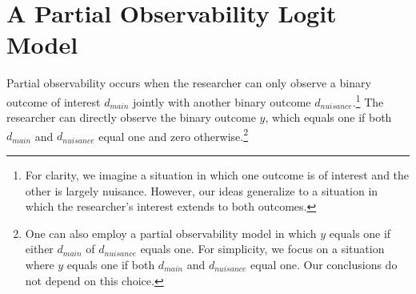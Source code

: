 \documentclass[10pt]{article}
\begin{document}
\section*{A Partial Observability Logit Model}

Partial observability occurs when the researcher can only observe a binary outcome of interest $d_{main}$ jointly with another binary outcome $d_{nuisance}$.\footnote{For clarity, we imagine a situation in which one outcome is of interest and the other is largely nuisance. 
However, our ideas generalize to a situation in which the researcher's interest extends to both outcomes.}
The researcher can directly observe the binary outcome $y$, which equals one if both $d_{main}$ and $d_{nuisance}$ equal one and zero otherwise.\footnote{One can also employ a partial observability model in which $y$ equals one if either $d_{main}$ of $d_{nuisance}$ equals one. 
For simplicity, we focus on a situation where $y$ equals one if both $d_{main}$ and $d_{nuisance}$ equal one. 
Our conclusions do not depend on this choice.}
\end{document}
